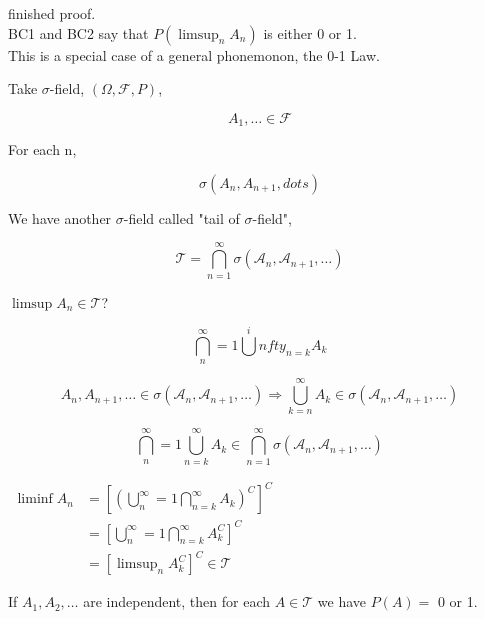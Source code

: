 \documentclass[11pt,fleqn]{book} %
\begin{document}
finished proof. \\

BC1 and BC2 say that  $P \left(\limsup_n A_n \right)$ is either 0 or 1.\\

This is a special case of a general phonemonon, the 0-1 Law.

Take $\sigma$-field, $(\Omega, \mathcal{F}, P)$, 

$$A_1, \dots \in \mathcal{F} $$

For each n, 

$$\sigma(A_n, A_{n+1}, dots) $$

We have another $\sigma$-field called "tail of $\sigma$-field",

$$\mathcal{T} =  \bigcap ^\infty_{n=1} \sigma(\mathcal{A}_n, \mathcal{A}_{n+1}, \dots) $$

\begin{example}[4.18 in Billingsly]
	$\limsup A_n \in \mathcal{T}$?

		$$\bigcap ^\infty_n=1 \bigcup^infty_{n=k}  A_k  $$

		$$ A_n, A_{n+1}, \dots \in \sigma(\mathcal{A}_n, \mathcal{A}_{n+1}, \dots) \Rightarrow \bigcup^\infty_{k=n} A_k \in \sigma(\mathcal{A}_n, \mathcal{A}_{n+1}, \dots)$$

		$$\bigcap ^\infty_n=1 \bigcup^\infty_{n=k}  A_k \in \bigcap ^\infty_{n=1} \sigma(\mathcal{A}_n, \mathcal{A}_{n+1}, \dots) $$

	$\begin{aligned}
		\liminf A_n &= \left[ (\bigcup^\infty_n=1 \bigcap ^\infty_{n=k}  A_k )^C \right]^C\\
			&= \left[ \bigcup^\infty_n=1 \bigcap ^\infty_{n=k}  A_k^C \right]^C\\
			&= \left[\limsup_n A_k^C \right]^C \in \mathcal{T}
	\end{aligned}
	$


\end{example}



\begin{theorem}
	If $A_1, A_2, \dots$ are independent, then for each $A \in \mathcal{T}$ we have $P(A) = $ 0 or 1.
\end{theorem}
\end{document}
